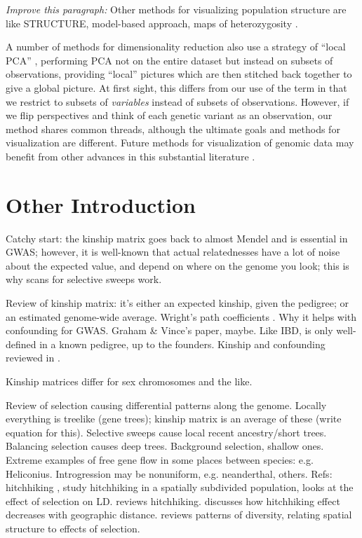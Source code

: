 \documentclass[11pt, oneside]{article}   	%
\newcommand{\plr}[1]{{\em \color{blue} #1}}
\begin{document}
\plr{Improve this paragraph:}
Other methods for visualizing population structure are like STRUCTURE,
\citep{pritchard2000inference,falush2003inference,
falush2007inference,hubisz2009inferring} 
model-based approach,
\citep{yang2012modelbased} 
maps of heterozygosity
\citep{ramachandran2005support}. 

A number of methods for dimensionality reduction also use a strategy of ``local PCA''
\citep[e.g.][]{manjon2013diffusion,kambhatla1997dimension,weingessel2000local,roweis2000nonlinear},
performing PCA not on the entire dataset but instead on subsets of observations,
providing ``local'' pictures which are then stitched back together to give a global picture.
At first sight,
this differs from our use of the term in that we restrict to subsets of \emph{variables} instead of subsets of observations.
However, if we flip perspectives and think of each genetic variant as an observation,
our method shares common threads, although the ultimate goals and methods for visualization are different.
Future methods for visualization of genomic data
may benefit from other advances in this substantial literature \citep[reviewed in][]{vandermaaten2009dimensionality}.


\section{Other Introduction}

Catchy start: the kinship matrix goes back to almost Mendel and is essential in GWAS;
however, it is well-known that actual relatednesses have a lot of noise about the expected value,
and depend on where on the genome you look;
this is why scans for selective sweeps work.

Review of kinship matrix: 
it's either an expected kinship, given the pedigree;
or an estimated genome-wide average.
Wright's path coefficients \citep{wright1943isolation}.
Why it helps with confounding for GWAS.
Graham \& Vince's paper, maybe.
Like IBD, is only well-defined in a known pedigree, up to the founders.
Kinship and confounding reviewed in \citet{astle2009population}.

Kinship matrices differ for sex chromosomes and the like.

Review of selection causing differential patterns along the genome.
Locally everything is treelike (gene trees);
kinship matrix is an average of these (write equation for this).
Selective sweeps cause local recent ancestry/short trees.
Balancing selection causes deep trees.
Background selection, shallow ones.
Extreme examples of free gene flow in some places between species: e.g. Heliconius.
Introgression may be nonuniform, e.g. neanderthal, others.
Refs: hitchhiking \citep{maynardsmith1974hitchhiking},
\citet{kim2011hitchhiking} study hitchhiking in a spatially subdivided population,
\citet{mcvean2007structure} looks at the effect of selection on LD.
\citet{barton2000genetic} reviews hitchhiking.
\citet{bierne2010distinctive} discusses how hitchhiking effect decreases with geographic distance.
\citet{charlesworth2003review} reviews patterns of diversity, relating spatial structure to effects of selection.
\end{document}

